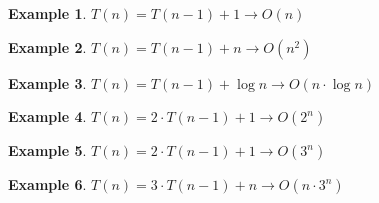 \documentclass[]{article}
\theoremstyle{plain}
\theoremstyle{definition}
\newtheorem{lem}{Example}[thm]
\begin{document}
\begin{lem}
$T(n) = T(n - 1) + 1 \rightarrow O(n)$
\end{lem}

\begin{lem}
    $T(n) = T(n - 1) + n \rightarrow O(n^2)$
\end{lem}

\begin{lem}
    $T(n) = T(n - 1) + \log{n} \rightarrow O(n\cdot \log{n})$
\end{lem}

\begin{lem}
    $T(n) = 2\cdot T(n - 1) + 1 \rightarrow O(2^n)$
\end{lem}

\begin{lem}
    $T(n) = 2\cdot T(n - 1) + 1 \rightarrow O(3^n)$
\end{lem}
\begin{lem}
    $T(n) = 3\cdot T(n - 1) + n \rightarrow O(n\cdot 3^n)$
\end{lem}
\end{document}
